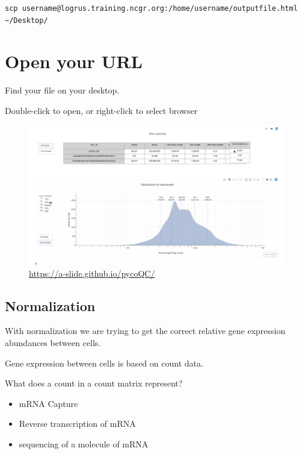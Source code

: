 \documentclass[
]{book}
\providecommand{\tightlist}{%
  \setlength{\itemsep}{0pt}\setlength{\parskip}{0pt}}
\begin{document}
\begin{verbatim}
scp username@logrus.training.ncgr.org:/home/username/outputfile.html ~/Desktop/
\end{verbatim}

\hypertarget{open-your-url}{%
\section{Open your URL}\label{open-your-url}}

Find your file on your desktop.

Double-click to open, or right-click to select browser

\begin{figure}
\centering
\includegraphics[width=1\textwidth,height=\textheight]{Figures/PycoQC.png}
\caption{\url{https://a-slide.github.io/pycoQC/}}
\end{figure}

\hypertarget{normalization}{%
\subsection{Normalization}\label{normalization}}

With normalization we are trying to get the correct relative gene expression abundances between cells.

Gene expression between cells is based on count data.

What does a count in a count matrix represent?

\begin{itemize}
\tightlist
\item
  mRNA Capture
\item
  Reverse transcription of mRNA
\item
  sequencing of a molecule of mRNA
\end{itemize}
\end{document}
